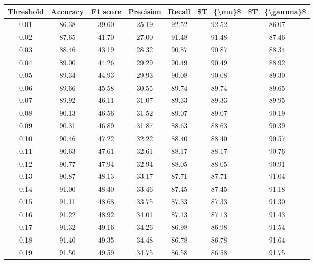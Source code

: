 \begin{tabular}{|c|c|c|c|c|c|c|}
\hline
 Threshold &  Accuracy &  F1 score &  Precision &  Recall &  \$T\_\{\textbackslash mu\}\$ &  \$T\_\{\textbackslash gamma\}\$ \\
\hline
      0.01 &     86.38 &     39.60 &      25.19 &   92.52 &      92.52 &         86.07 \\
      0.02 &     87.65 &     41.70 &      27.00 &   91.48 &      91.48 &         87.46 \\
      0.03 &     88.46 &     43.19 &      28.32 &   90.87 &      90.87 &         88.34 \\
      0.04 &     89.00 &     44.26 &      29.29 &   90.49 &      90.49 &         88.92 \\
      0.05 &     89.34 &     44.93 &      29.93 &   90.08 &      90.08 &         89.30 \\
      0.06 &     89.66 &     45.58 &      30.55 &   89.74 &      89.74 &         89.65 \\
      0.07 &     89.92 &     46.11 &      31.07 &   89.33 &      89.33 &         89.95 \\
      0.08 &     90.13 &     46.56 &      31.52 &   89.07 &      89.07 &         90.19 \\
      0.09 &     90.31 &     46.89 &      31.87 &   88.63 &      88.63 &         90.39 \\
      0.10 &     90.46 &     47.22 &      32.22 &   88.40 &      88.40 &         90.57 \\
      0.11 &     90.63 &     47.61 &      32.61 &   88.17 &      88.17 &         90.76 \\
      0.12 &     90.77 &     47.94 &      32.94 &   88.05 &      88.05 &         90.91 \\
      0.13 &     90.87 &     48.13 &      33.17 &   87.71 &      87.71 &         91.04 \\
      0.14 &     91.00 &     48.40 &      33.46 &   87.45 &      87.45 &         91.18 \\
      0.15 &     91.11 &     48.68 &      33.75 &   87.33 &      87.33 &         91.30 \\
      0.16 &     91.22 &     48.92 &      34.01 &   87.13 &      87.13 &         91.43 \\
      0.17 &     91.32 &     49.16 &      34.26 &   86.98 &      86.98 &         91.54 \\
      0.18 &     91.40 &     49.35 &      34.48 &   86.78 &      86.78 &         91.64 \\
      0.19 &     91.50 &     49.59 &      34.75 &   86.58 &      86.58 &         91.75 \\

\end{tabular}
